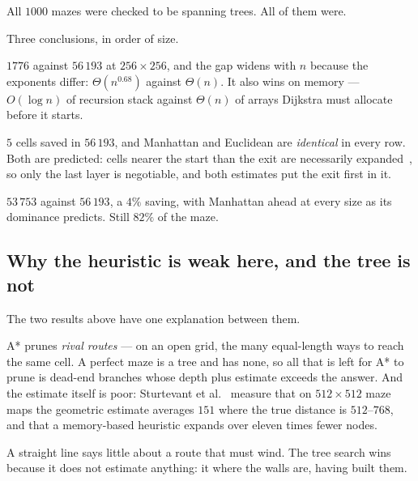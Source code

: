 All $1000$ mazes were checked to be spanning trees. All of them were.



Three conclusions, in order of size.

\begin{description}[leftmargin=*,style=nextline,itemsep=6pt]
  \item[The tree beats the graph by a factor of thirty.] $1776$ against
    $56\,193$ at $256\times256$, and the gap widens with $n$ because the
    exponents differ: $\Theta(n^{0.68})$ against $\Theta(n)$. It also wins on
    memory --- $O(\log n)$ of recursion stack against $\Theta(n)$ of arrays
    Dijkstra must allocate before it starts.
  \item[Heuristic tie-breaking does nothing.] $5$ cells saved in $56\,193$, and
    Manhattan and Euclidean are \emph{identical} in every row. Both are
    predicted: cells nearer the start than the exit are necessarily
    expanded~\cite{dechter1985generalized}, so only the last layer is
    negotiable, and both estimates put the exit first in it.
  \item[A* helps a little, and Manhattan beats Euclidean.] $53\,753$ against
    $56\,193$, a $4\%$ saving, with Manhattan ahead at every size as its
    dominance predicts. Still $82\%$ of the maze.
\end{description}

\subsection{Why the heuristic is weak here, and the tree is not}

The two results above have one explanation between them.

A* prunes \emph{rival routes} --- on an open grid, the many equal-length ways to
reach the same cell. A perfect maze is a tree and has none, so all that is left
for A* to prune is dead-end branches whose depth plus estimate exceeds the
answer. And the estimate itself is poor: Sturtevant et
al.~\cite{sturtevant2009memory} measure that on $512\times512$ maze maps the
geometric estimate averages $151$ where the true distance is $512$--$768$, and
that a memory-based heuristic expands over eleven times fewer nodes.

\begin{keypoint}
A straight line says little about a route that must wind. The tree search wins
because it does not estimate anything: it  where the walls are,
having built them.
\end{keypoint}

